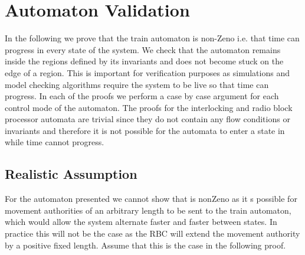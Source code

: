 \section{Automaton Validation}
In the following we prove that the train automaton is non-Zeno i.e. that time can progress in every state of the system. We check that the automaton remains inside the regions defined by its invariants and does not become stuck on the edge of a region. This is important for verification purposes as simulations and model checking algorithms require the system to be live so that time can progress. In each of the proofs we perform a case by case argument for each control mode of the automaton. The proofs for the interlocking and radio block processor  automata are trivial since they do not contain any flow conditions or invariants and therefore it is not possible for the automata to enter a state in while time cannot progress.
\medskip
\subsection{Realistic Assumption}
For the automaton presented we cannot show that is nonZeno as it s possible for movement authorities of an arbitrary length to be sent to the train automaton, which would allow the system alternate faster and faster between states. In practice this will not be the case as the RBC will extend the movement authority by a positive fixed length.  Assume that this is the case in the following proof.


